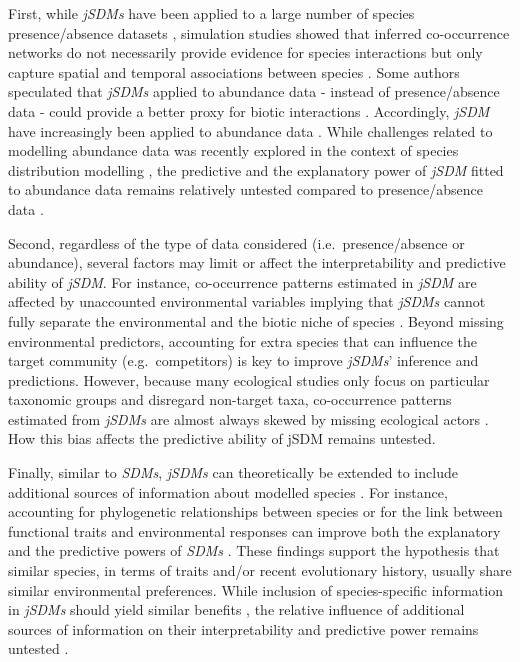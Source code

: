 \begin{refsection}
First, while \emph{jSDMs} have been applied to a large number of species
presence/absence datasets \autocites[ ]{Norberg_2019}[
]{Wilkinson_2019}{Wilkinson_2020}, simulation studies showed that
inferred co-occurrence networks do not necessarily provide evidence for
species interactions \autocites[ ]{Dormann_2018}{Blanchet_2020} but only
capture spatial and temporal associations between species
\autocite{Keil_2021}. Some authors speculated that \emph{jSDMs} applied
to abundance data - instead of presence/absence data - could provide a
better proxy for biotic interactions \autocites[
]{Blanchet_2020}{Momal_2020}. Accordingly, \emph{jSDM} have increasingly
been applied to abundance data \autocites[ ]{Hui_2016}[
]{Ovaskainen_2017a}{Chiquet_2021}. While challenges related to modelling
abundance data was recently explored in the context of species
distribution modelling \autocite{Waldock_2022}, the predictive and the
explanatory power of \emph{jSDM} fitted to abundance data remains
relatively untested compared to presence/absence data \autocites[
]{Norberg_2019}{Wilkinson_2020}.

Second, regardless of the type of data considered (i.e.~presence/absence
or abundance), several factors may limit or affect the interpretability
and predictive ability of \emph{jSDM}. For instance, co-occurrence
patterns estimated in \emph{jSDM} are affected by unaccounted
environmental variables implying that \emph{jSDMs} cannot fully separate
the environmental and the biotic niche of species \autocites[
]{Blanchet_2020}{Poggiato_2021}. Beyond missing environmental
predictors, accounting for extra species that can influence the target
community (e.g.~competitors) is key to improve \emph{jSDMs}' inference
and predictions. However, because many ecological studies only focus on
particular taxonomic groups \autocites[ ]{Pollock_2014}{Hakkila_2018}
and disregard non-target taxa, co-occurrence patterns estimated from
\emph{jSDMs} are almost always skewed by missing ecological actors
\autocite{Momal_2021}. How this bias affects the predictive ability of
jSDM remains untested.

Finally, similar to \emph{SDMs}, \emph{jSDMs} can theoretically be
extended to include additional sources of information about modelled
species \autocites[ ]{Niku_2019}{Ovaskainen_2017a}. For instance,
accounting for phylogenetic relationships between species
\autocite{Ives_2011} or for the link between functional traits and
environmental responses \autocite{Pollock_2012} can improve both the
explanatory and the predictive powers of \emph{SDMs} \autocites[
]{Morales-Castilla_2017}{Vesk_2021}. These findings support the
hypothesis that similar species, in terms of traits and/or recent
evolutionary history, usually share similar environmental preferences.
While inclusion of species-specific information in \emph{jSDMs} should
yield similar benefits \autocite{Ovaskainen_2017a}, the relative
influence of additional sources of information on their interpretability
and predictive power remains untested \autocites[ ]{Norberg_2019}[
]{Wilkinson_2019}{Abrego_2022}.


\end{refsection}

